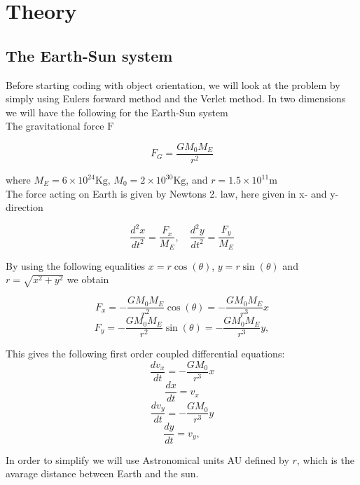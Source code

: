 \documentclass[../main.tex]{subfiles}
\begin{document}
\section{Theory}\label{theory}
\subsection{The Earth-Sun system}
Before starting coding with object orientation, we will look at the problem by simply using Eulers forward method and the Verlet method.
In two dimensions we will have the following for the Earth-Sun system \\

The gravitational force  $\text{F}$

\begin{equation}
  F_G= \frac{GM_0M_E}{r^2}
\end{equation}

where $M_E = 6\times 10^{24}\text{Kg}$,  $ M_0 = 2\times 10^{30}\text{Kg}$, and  $r = 1.5\times 10^{11}\text{m}$\\ The force acting on Earth is given by Newtons 2. law, here given in x- and y- direction

$$ \frac{d^2x}{dt^2} = \frac{F_x}{M_E}, \quad \frac{d^2y}{dt^2} = \frac{F_y}{M_E}$$

By using the following equalities $x = r \cos(\theta)$,  $y = r\sin(\theta)$ and $r = \sqrt{x^2 +y^2}$ we obtain

\begin{equation}
  F_x = - \frac{GM_0M_E}{r^2} \cos(\theta) =- \frac{GM_0M_E}{r^3}x
\end{equation}
\begin{equation}
  F_y = - \frac{GM_0M_E}{r^2}\sin(\theta) =- \frac{GM_0M_E}{r^3}y,
\end{equation}

This gives the following first order  coupled differential equations:
\begin{equation}
  \frac{dv_x}{dt} = - \frac{GM_0}{r^3}x
\end{equation}
\begin{equation}
  \frac{dx}{dt} = v_x
\end{equation}
\begin{equation}
  \frac{dv_y}{dt} = - \frac{GM_0}{r^3}y
\end{equation}
\begin{equation}
  \frac{dy}{dt} = v_y,
\end{equation}

In order to simplify we will use Astronomical units AU defined by $r$, which is the avarage distance between Earth and the sun.
\end{document}
